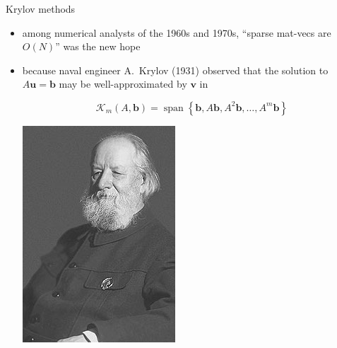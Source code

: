 \documentclass[hide notes,intlimits,usenames,dvipsnames]{beamer}
\newcommand{\bb}{\mathbf{b}}
\newcommand{\bu}{\mathbf{u}}
\newcommand{\bv}{\mathbf{v}}
\begin{document}
\begin{frame}{Krylov methods}
\begin{itemize}
\item among numerical analysts of the 1960s and 1970s, ``sparse mat-vecs are $O(N)$'' was the new hope
\item \begin{minipage}[t]{0.7\textwidth}
because naval engineer A.~Krylov (1931) observed that the solution to $A\bu=\bb$ may be well-approximated by $\bv$ in

\vspace{-4mm}
$$\mathcal{K}_m(A,\bb) = \operatorname{span}\left\{\bb,A\bb,A^2\bb,\dots,A^m\bb\right\}$$
\end{minipage} \quad
\begin{minipage}[t]{0.18\textwidth}
\vspace{-3mm}

\includegraphics[width=\textwidth]{figs/krylov}
\end{minipage}


\end{itemize}
\end{frame}
\end{document}

